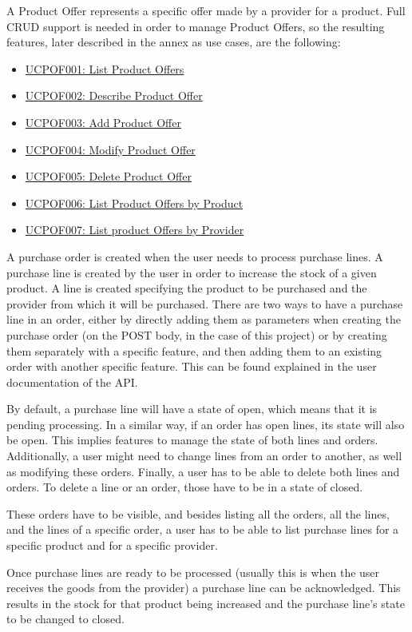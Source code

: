 A Product Offer represents a specific offer made by a provider for a product. Full CRUD support is needed in order to manage Product Offers, so the resulting features, later described in the annex as use cases, are the following:
\hfill\break
\begin{itemize}
\item \hyperref[UCPOF001]{UCPOF001: List Product Offers}
\item \hyperref[UCPOF002]{UCPOF002: Describe Product Offer}
\item \hyperref[UCPOF003]{UCPOF003: Add Product Offer}
\item \hyperref[UCPOF004]{UCPOF004: Modify Product Offer}
\item \hyperref[UCPOF005]{UCPOF005: Delete Product Offer}
\item \hyperref[UCPOF006]{UCPOF006: List Product Offers by Product}
\item \hyperref[UCPOF007]{UCPOF007: List product Offers by Provider}

\end{itemize}
\hfill\break
A purchase order is created when the user needs to process purchase lines. A purchase line is created by the user in order to increase the stock of a given product. A line is created specifying the product to be purchased and the provider from which it will be purchased. There are two ways to have a purchase line in an order, either by directly adding them as parameters when creating the purchase order (on the POST body, in the case of this project) or by creating them separately with a specific feature, and then adding them to an existing order with another specific feature. This can be found explained in the user documentation of the API.

By default, a purchase line will have a state of open, which means that it is pending processing. In a similar way, if an order has open lines, its state will also be open. This implies features to manage the state of both lines and orders. Additionally, a user might need to change lines from an order to another, as well as modifying these orders. Finally, a user has to be able to delete both lines and orders. To delete a line or an order, those have to be in a state of closed.

These orders have to be visible, and besides listing all the orders, all the lines, and the lines of a specific order, a user has to be able to list purchase lines for a specific product and for a specific provider.

Once purchase lines are ready to be processed (usually this is when the user receives the goods from the provider) a purchase line can be acknowledged. This results in the stock for that product being increased and the purchase line’s state to be changed to closed.

